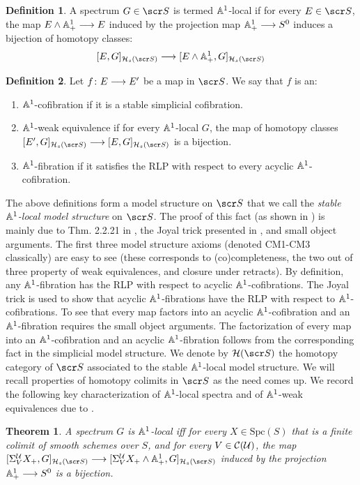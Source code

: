\documentclass{amsart}
\newtheorem{thm}{Theorem}[section]
\theoremstyle{definition}
\newtheorem{defn}{Definition}[section]
\begin{document}
\begin{defn}
A spectrum $G \in \sS$ is termed $\mathbb{A}^1$-local if for every $E \in \sS$, the map $E \wedge \mathbb{A}^1_+ \longrightarrow E$ induced by the projection map $\mathbb{A}^1_+ \longrightarrow S^0$ induces a bijection of homotopy classes:
\[[E,G]_{\oH_s(\sS)} \rtarr [E \wedge \bA^1_+, G]_{\oH_s(\sS)}\]
\end{defn}

\begin{defn}
Let $f \colon E \longrightarrow E'$ be a map in $\sS$. We say that $f$ is an:
\begin{enumerate}
\item $\mathbb{A}^1$-cofibration if it is a stable simplicial cofibration.
\item $\mathbb{A}^1$-weak equivalence if for every $\mathbb{A}^1$-local $G$, the map of homotopy classes $[E',G]_{\oH_s(\sS)} \rtarr [E,G]_{\oH_s(\sS)}$ is a bijection.
\item $\mathbb{A}^1$-fibration if it satisfies the RLP with respect to every acyclic $\mathbb{A}^1$-cofibration.
\end{enumerate}
\end{defn}

The above definitions form a model structure on $\sS$ that we call the \emph{stable $\mathbb{A}^1$-local model structure} on $\sS$. The proof of this fact (as shown in \cite{Hu03}) is mainly due to Thm. 2.2.21 in \cite{MV99}, the Joyal trick presented in \cite{Jardine87simppr}, and small object arguments. The first three model structure axioms (denoted CM1-CM3 classically) are easy to see (these corresponds to (co)completeness, the two out of three property of weak equivalences, and closure under retracts). By definition, any $\mathbb{A}^1$-fibration has the RLP with respect to acyclic $\mathbb{A}^1$-cofibrations. The Joyal trick is used to show that acyclic $\mathbb{A}^1$-fibrations have the RLP with respect to $\mathbb{A}^1$-cofibrations. To see that every map factors into an acyclic $\mathbb{A}^1$-cofibration and an $\mathbb{A}^1$-fibration requires the small object arguments. The factorization of every map into an $\mathbb{A}^1$-cofibration and an acyclic $\mathbb{A}^1$-fibration follows from the corresponding fact in the simplicial model structure. We denote by $\oH(\sS)$ the homotopy category of $\sS$ associated to the stable $\mathbb{A}^1$-local model structure. We will recall properties of homotopy colimits in $\sS$ as the need comes up. We record the following key characterization of $\mathbb{A}^1$-local spectra and of $\mathbb{A}^1$-weak equivalences due to \cite{Hu03}.

\begin{thm}
A spectrum $G$ is $\mathbb{A}^1$-local iff for every $X \in \mathrm{Spc}(S)$ that is a finite colimit of smooth schemes over $S$, and for every $V \in {\mathcal{C}}({\mathcal{U}})$, the map $[\SI^{\oU}_V X_+, G]_{\oH_s(\sS)} \rtarr [\SI^{\oU}_{V}X_+ \wedge \bA^1_+, G]_{\oH_s(\sS)}$ induced by the projection $\mathbb{A}^1_+ \longrightarrow S^0$ is a bijection.
\end{thm}
\end{document}
